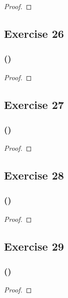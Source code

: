 \documentclass[14pt]{extarticle}
\begin{document}
\begin{proof}

\end{proof}

\subsection{Exercise 26}

\subsubsection{()}

\begin{proof}

\end{proof}

\subsection{Exercise 27}

\subsubsection{()}

\begin{proof}

\end{proof}

\subsection{Exercise 28}

\subsubsection{()}

\begin{proof}

\end{proof}

\subsection{Exercise 29}

\subsubsection{()}

\begin{proof}

\end{proof}
\end{document}
